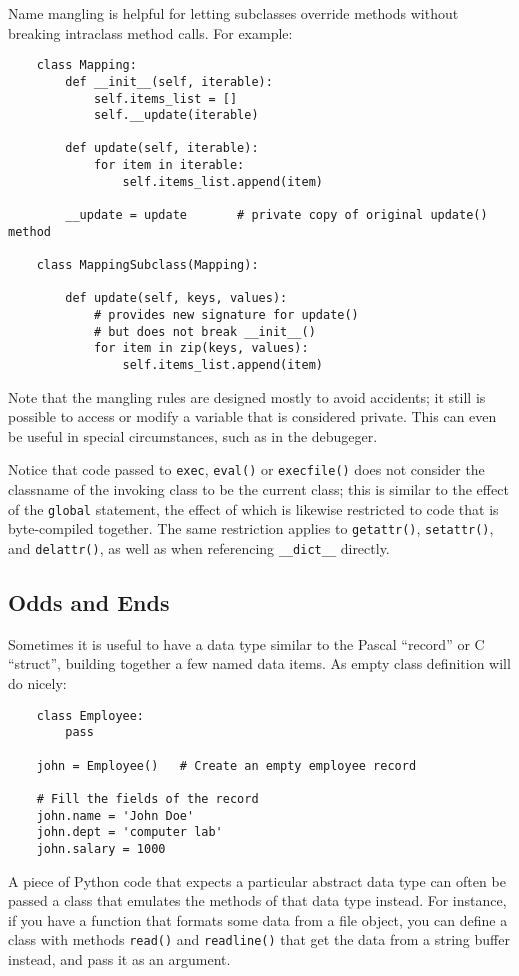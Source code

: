 \documentclass[UTF8]{article}
\begin{document}
Name mangling is helpful for letting subclasses override methods without breaking intraclass method
calls. For example:
\begin{verbatim}
    class Mapping:
        def __init__(self, iterable):
            self.items_list = []
            self.__update(iterable)

        def update(self, iterable):
            for item in iterable:
                self.items_list.append(item)

        __update = update       # private copy of original update() method

    class MappingSubclass(Mapping):

        def update(self, keys, values):
            # provides new signature for update()
            # but does not break __init__()
            for item in zip(keys, values):
                self.items_list.append(item)
\end{verbatim}

Note that the mangling rules are designed mostly to avoid accidents; it still is possible to access
or modify a variable that is considered private. This can even be useful in special circumstances,
such as in the debugeger.

Notice that code passed to \texttt{exec}, \texttt{eval()} or \texttt{execfile()} does not consider
the classname of the invoking class to be the current class; this is similar to the effect of the
\texttt{global} statement, the effect of which is likewise restricted to code that is byte-compiled
together. The same restriction applies to \texttt{getattr()}, \texttt{setattr()}, and
\texttt{delattr()}, as well as when referencing \texttt{\_\_dict\_\_} directly.

\subsection{Odds and Ends}
Sometimes it is useful to have a data type similar to the Pascal ``record'' or C ``struct'',
building together a few named data items. As empty class definition will do nicely:
\begin{verbatim}
    class Employee:
        pass

    john = Employee()   # Create an empty employee record

    # Fill the fields of the record
    john.name = 'John Doe'
    john.dept = 'computer lab'
    john.salary = 1000
\end{verbatim}

A piece of Python code that expects a particular abstract data type can often be passed a class
that emulates the methods of that data type instead. For instance, if you have a function that
formats some data from a file object, you can define a class with methods \texttt{read()} and
\texttt{readline()} that get the data from a string buffer instead, and pass it as an argument.
\end{document}
